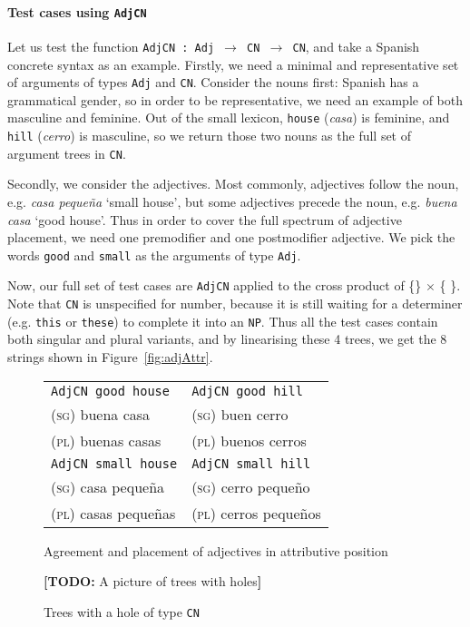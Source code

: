 \documentclass[11pt]{article}
\def\t#1{\texttt{#1}}
\newcommand{\todo}[1]{{\color{cyan}\textbf{[TODO: }#1\textbf{]}}}
\begin{document}
\paragraph{Test cases using \t{AdjCN}} Let us test the function
\t{AdjCN : Adj $\rightarrow$ CN $\rightarrow$ CN}, and take a Spanish
concrete syntax as an example. 
Firstly, we need a minimal and representative set of arguments of types
\t{Adj} and \t{CN}. Consider the nouns first: Spanish has a
grammatical gender, so in order to be representative, we need an
example of both masculine and feminine. Out of the small lexicon,
\t{house} (\emph{casa}) is feminine, and \t{hill} (\emph{cerro}) is
masculine, so we return those two nouns as the full set of argument
trees in \t{CN}. 

Secondly, we consider the adjectives. Most commonly, adjectives follow
the noun, e.g. \emph{casa peque\~{n}a} `small house', but some
adjectives precede the noun, e.g. \emph{buena casa} `good house'. Thus 
in order to cover the full spectrum of adjective placement, we need
one premodifier and one postmodifier adjective. We pick the words
\t{good} and \t{small} as the arguments of type \t{Adj}. 

Now, our full set of test cases are \t{AdjCN} applied to the cross
product of \{\}
$\times$ \{ \}.
Note that \t{CN} is unspecified for number, because it is still waiting for a
determiner (e.g. \t{this} or \t{these}) to complete it into an
\t{NP}. Thus all the test cases contain both singular and plural
variants, and by linearising these 4 trees, we get the 8 strings shown
in Figure~\ref{fig:adjAttr}.

\begin{figure}
\centering
\begin{minipage}{.5\textwidth}
\centering
\begin{tabular}{| l | l |}
\hline
\t{AdjCN good house}   & \t{AdjCN good hill} \\ 
\textsc{(sg)} buena casa             & \textsc{(sg)} buen cerro \\
\textsc{(pl)} buenas casas           & \textsc{(pl)} buenos cerros \\ \hline

\t{AdjCN small house}   & \t{AdjCN small hill} \\ 
\textsc{(sg)} casa  peque\~{n}a            & \textsc{(sg)} cerro  peque\~{n}o \\
\textsc{(pl)} casas  peque\~{n}as          & \textsc{(pl)} cerros  peque\~{n}os \\ \hline
\end{tabular}
\caption{Agreement and placement of adjectives in attributive position}
\label{fig:adjAttr}
\end{minipage}%
\begin{minipage}{.5\textwidth}
  \centering
  \todo{A picture of trees with holes}
 \caption{Trees with a hole of type \t{CN}}
\label{fig:treesWithHoles}
\end{minipage}
\end{figure}
\end{document}
